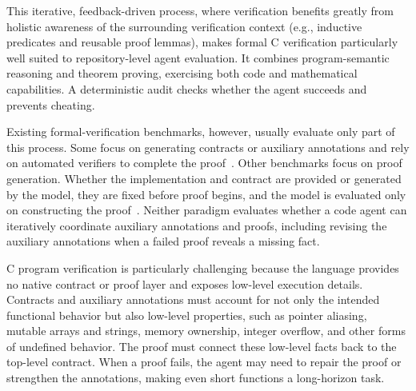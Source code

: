 This iterative, feedback-driven process, where verification benefits greatly from holistic awareness of the surrounding verification context (e.g.,  inductive predicates and reusable proof lemmas), makes formal C verification particularly well suited to repository-level agent evaluation. It combines program-semantic reasoning and theorem proving, exercising both code and mathematical capabilities. A deterministic audit checks whether the agent succeeds and prevents cheating. 


Existing formal-verification benchmarks, however, usually evaluate only part of this process. Some focus on generating contracts or auxiliary annotations and rely on automated verifiers to complete the proof~\cite{lecong2025formalbench,loughridge2024dafnybench,sun2024clover}. Other benchmarks focus on proof generation.  Whether the implementation and contract are provided or generated by the model, they are fixed before proof begins, and the model is evaluated only on constructing the proof~\cite{thakur2025clever,ye2026verina,miranda2026veribench,dougherty2025proving,xu2026neural,xin2026verisoftbench}. Neither paradigm evaluates whether a code agent can iteratively coordinate auxiliary annotations and proofs, including revising the auxiliary annotations when a failed proof reveals a missing fact.

C program verification is  particularly challenging because the language provides no native contract or proof layer and exposes low-level execution details. Contracts and auxiliary annotations must account for not only the intended functional behavior but also low-level properties, such as  pointer aliasing, mutable arrays and strings, memory ownership, integer overflow, and other forms of undefined behavior. The proof must connect these low-level facts back to the top-level contract. When a proof fails, the agent may need to repair the proof or strengthen the  annotations, making even short functions a long-horizon task.

